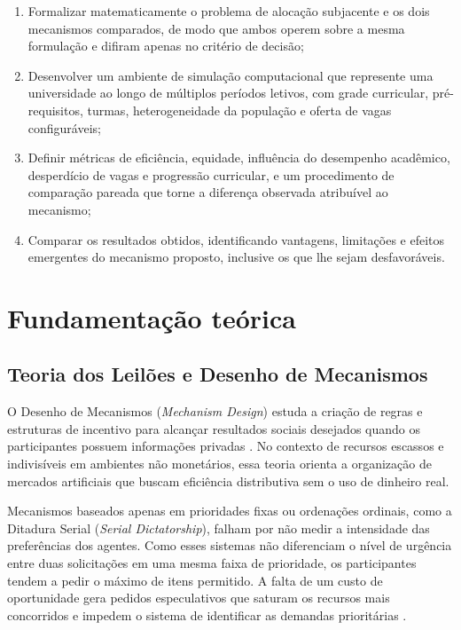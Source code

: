 \documentclass[
    12pt,
    openany,
    oneside,
    a4paper,
    english,
    brazil
]{abntex2}
\begin{document}
\begin{enumerate}[label=\Roman*.]
    \item Formalizar matematicamente o problema de alocação subjacente e os dois mecanismos comparados, de modo que ambos operem sobre a mesma formulação e difiram apenas no critério de decisão;
    \item Desenvolver um ambiente de simulação computacional que represente uma universidade ao longo de múltiplos períodos letivos, com grade curricular, pré-requisitos, turmas, heterogeneidade da população e oferta de vagas configuráveis;
    \item Definir métricas de eficiência, equidade, influência do desempenho acadêmico, desperdício de vagas e progressão curricular, e um procedimento de comparação pareada que torne a diferença observada atribuível ao mecanismo;
    \item Comparar os resultados obtidos, identificando vantagens, limitações e efeitos emergentes do mecanismo proposto, inclusive os que lhe sejam desfavoráveis.
\end{enumerate}

\chapter{Fundamentação teórica}
\label{sec:fundamentacao_teorica}

\section{Teoria dos Leilões e Desenho de Mecanismos}
\label{sec:teoria_leiloes}

O Desenho de Mecanismos (\textit{Mechanism Design}) estuda a criação de regras e estruturas de incentivo para alcançar resultados sociais desejados quando os participantes possuem informações privadas \cite{sonmez2011}. No contexto de recursos escassos e indivisíveis em ambientes não monetários, essa teoria orienta a organização de mercados artificiais que buscam eficiência distributiva sem o uso de dinheiro real.

Mecanismos baseados apenas em prioridades fixas ou ordenações ordinais, como a Ditadura Serial (\textit{Serial Dictatorship}), falham por não medir a intensidade das preferências dos agentes. Como esses sistemas não diferenciam o nível de urgência entre duas solicitações em uma mesma faixa de prioridade, os participantes tendem a pedir o máximo de itens permitido. A falta de um custo de oportunidade gera pedidos especulativos que saturam os recursos mais concorridos e impedem o sistema de identificar as demandas prioritárias \cite{sonmez2011}.
\end{document}
